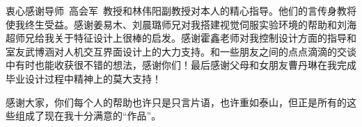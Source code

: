 \begin{acknowledgements}
衷心感谢导师~高会军~教授和林伟阳副教授对本人的精心指导。他们的言传身教将使我终生受益。感谢姜易木、刘晨璐师兄对我搭建视觉伺服实验环境的帮助和刘海超师兄给我关于特征设计上很棒的启发。感谢霍鑫老师对我控制设计方面的指导和室友武博涵对人机交互界面设计上的大力支持。和一些朋友之间的点点滴滴的交谈中有时也能收获很不错的想法，感谢你们！最后感谢父母和女朋友曹丹琳在我完成毕业设计过程中精神上的莫大支持！


感谢大家，你们每个人的帮助也许只是只言片语，也许重如泰山，但正是所有的这些组成了现在我十分满意的“作品”。

\end{acknowledgements}
